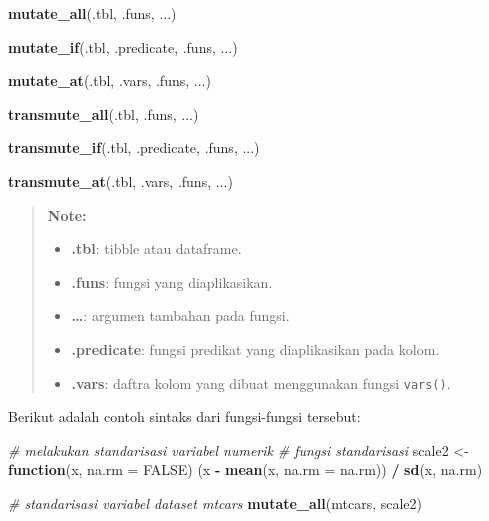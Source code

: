 \documentclass[]{book}
\newenvironment{Shaded}{\begin{snugshade}}{\end{snugshade}}
\newcommand{\KeywordTok}[1]{\textcolor[rgb]{0.13,0.29,0.53}{\textbf{#1}}}
\newcommand{\DataTypeTok}[1]{\textcolor[rgb]{0.13,0.29,0.53}{#1}}
\newcommand{\StringTok}[1]{\textcolor[rgb]{0.31,0.60,0.02}{#1}}
\newcommand{\CommentTok}[1]{\textcolor[rgb]{0.56,0.35,0.01}{\textit{#1}}}
\newcommand{\OtherTok}[1]{\textcolor[rgb]{0.56,0.35,0.01}{#1}}
\newcommand{\ControlFlowTok}[1]{\textcolor[rgb]{0.13,0.29,0.53}{\textbf{#1}}}
\newcommand{\OperatorTok}[1]{\textcolor[rgb]{0.81,0.36,0.00}{\textbf{#1}}}
\newcommand{\NormalTok}[1]{#1}
\providecommand{\tightlist}{%
  \setlength{\itemsep}{0pt}\setlength{\parskip}{0pt}}
\begin{document}
\begin{Shaded}
\begin{Highlighting}[]
\KeywordTok{mutate_all}\NormalTok{(.tbl, .funs, ...)}

\KeywordTok{mutate_if}\NormalTok{(.tbl, .predicate, .funs, ...)}

\KeywordTok{mutate_at}\NormalTok{(.tbl, .vars, .funs, ...)}

\KeywordTok{transmute_all}\NormalTok{(.tbl, .funs, ...)}

\KeywordTok{transmute_if}\NormalTok{(.tbl, .predicate, .funs, ...)}

\KeywordTok{transmute_at}\NormalTok{(.tbl, .vars, .funs, ...)}
\end{Highlighting}
\end{Shaded}

\begin{quote}
\textbf{Note: }

\begin{itemize}
\tightlist
\item
  \textbf{.tbl}: tibble atau dataframe.
\item
  \textbf{.funs}: fungsi yang diaplikasikan.
\item
  \textbf{\ldots{}}: argumen tambahan pada fungsi.
\item
  \textbf{.predicate}: fungsi predikat yang diaplikasikan pada kolom.
\item
  \textbf{.vars}: daftra kolom yang dibuat menggunakan fungsi
  \texttt{vars()}.
\end{itemize}
\end{quote}

Berikut adalah contoh sintaks dari fungsi-fungsi tersebut:

\begin{Shaded}
\begin{Highlighting}[]
\CommentTok{# melakukan standarisasi variabel numerik}
\CommentTok{# fungsi standarisasi}
\NormalTok{scale2 <-}\StringTok{ }\ControlFlowTok{function}\NormalTok{(x, }\DataTypeTok{na.rm =} \OtherTok{FALSE}\NormalTok{) (x }\OperatorTok{-}\StringTok{ }\KeywordTok{mean}\NormalTok{(x, }\DataTypeTok{na.rm =}\NormalTok{ na.rm)) }\OperatorTok{/}\StringTok{ }\KeywordTok{sd}\NormalTok{(x, na.rm)}

\CommentTok{# standarisasi variabel dataset mtcars}
\KeywordTok{mutate_all}\NormalTok{(mtcars, scale2)}
\end{Highlighting}
\end{Shaded}
\end{document}
